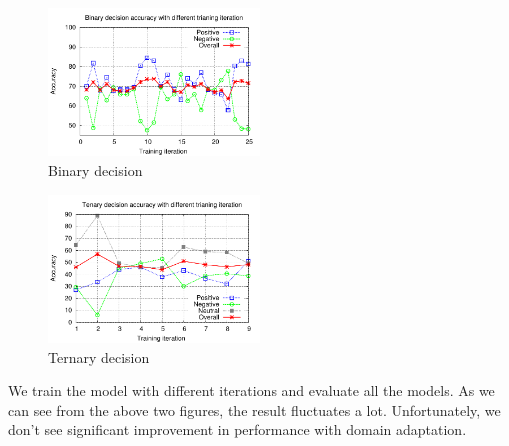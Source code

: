 \begin{itemize}
\begin{figure}[H]
\begin{center}
\includegraphics[width = 0.5\textwidth]{pic/model_2b.pdf}
\caption{Binary decision }
\end{center}
\end{figure}

\begin{figure}[H]
\begin{center}
\includegraphics[width = 0.5\textwidth]{pic/model_3c.pdf}
\caption{Ternary decision }
\end{center}
\end{figure}

We train the model with different iterations and evaluate all the models. As we can see from the above two figures, the result fluctuates a lot. Unfortunately, we don't see significant improvement in performance with domain adaptation.  




\end{itemize}







